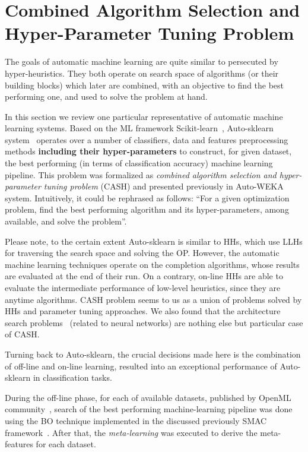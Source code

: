 \section{Combined Algorithm Selection and Hyper-Parameter Tuning Problem}\label{bg: section cash}
The goals of automatic machine learning are quite similar to persecuted by hyper-heuristics. They both operate on search space of algorithms (or their building blocks) which later are combined, with an objective to find the best performing one, and used to solve the problem at hand. 

In this section we review one particular representative of automatic machine learning systems.
Based on the ML framework Scikit-learn~\cite{scikit-learn}, Auto-sklearn system~\cite{feurer2015efficient} operates over a number of classifiers, data and features preprocessing methods \textbf{including their hyper-parameters} to construct, for given dataset, the best performing (in terms of classification accuracy) machine learning pipeline.
This problem was formalized as \textit{combined algorithm selection and hyper-parameter tuning problem} (CASH) and presented previously in Auto-WEKA~\cite{thornton2013auto} system. Intuitively, it could be rephrased as follows: ``For a given optimization problem, find the best performing algorithm and its hyper-parameters, among available, and solve the problem''. 

Please note, to the certain extent Auto-sklearn is similar to HHs, which use LLHs for traversing the search space and solving the OP. However, the automatic machine learning techniques operate on the completion algorithms, whose results are evaluated at the end of their run. On a contrary, on-line HHs are able to evaluate the intermediate performance of low-level heuristics, since they are anytime algorithms.
CASH problem seems to us as a union of problems solved by HHs and parameter tuning approaches. We also found that the architecture search problems~\cite{elsken2018neural} (related to neural networks) are nothing else but particular case of CASH.


Turning back to Auto-sklearn, the crucial decisions made here is the combination of off-line and on-line learning, resulted into an exceptional performance of Auto-sklearn in classification tasks.

During the off-line phase, for each of available datasets, published by OpenML community~\cite{OpenMLPython2019}, search of the best performing machine-learning pipeline was done using the BO technique implemented in the discussed previously SMAC framework~\cite{hutter2011sequential}.
After that, the \textit{meta-learning} was executed to derive the meta-features for each dataset.

